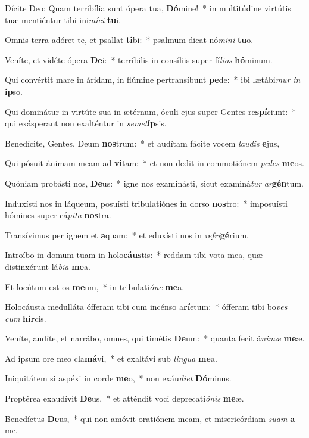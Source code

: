 \item Dícite Deo: Quam terribília sunt ópera tua, \textbf{Dó}mine!~* in multitúdine virtútis tuæ mentiéntur tibi ini\textit{mí}\textit{ci} \textbf{tu}i.
\item Omnis terra adóret te, et psallat \textbf{ti}bi:~* psalmum dicat nó\textit{mi}\textit{ni} \textbf{tu}o.
\item Veníte, et vidéte ópera \textbf{De}i:~* terríbilis in consíliis super fí\textit{li}\textit{os} \textbf{hó}minum.
\item Qui convértit mare in áridam, in flúmine pertransíbunt \textbf{pe}de:~* ibi lætábi\textit{mur} \textit{in} \textbf{ip}so.
\item Qui dominátur in virtúte sua in ætérnum, óculi ejus super Gentes re\textbf{spí}ciunt:~* qui exásperant non exalténtur in \textit{se}\textit{met}\textbf{íp}sis.
\item Benedícite, Gentes, Deum \textbf{nos}trum:~* et audítam fácite vocem \textit{lau}\textit{dis} \textbf{e}jus,
\item Qui pósuit ánimam meam ad \textbf{vi}tam:~* et non dedit in commotiónem \textit{pe}\textit{des} \textbf{me}os.
\item Quóniam probásti nos, \textbf{De}us:~* igne nos examinásti, sicut examiná\textit{tur} \textit{ar}\textbf{gén}tum.
\item Induxísti nos in láqueum, posuísti tribulatiónes in dorso \textbf{nos}tro:~* imposuísti hómines super cá\textit{pi}\textit{ta} \textbf{nos}tra.
\item Transívimus per ignem et \textbf{a}quam:~* et eduxísti nos in \textit{re}\textit{fri}\textbf{gé}rium.
\item Introíbo in domum tuam in holo\textbf{cáus}tis:~* reddam tibi vota mea, quæ distinxérunt lá\textit{bi}\textit{a} \textbf{me}a.
\item Et locútum est os \textbf{me}um,~* in tribulati\textit{ó}\textit{ne} \textbf{me}a.
\item Holocáusta medulláta ófferam tibi cum incénso a\textbf{rí}etum:~* ófferam tibi bo\textit{ves} \textit{cum} \textbf{hir}cis.
\item Veníte, audíte, et narrábo, omnes, qui timétis \textbf{De}um:~* quanta fecit á\textit{ni}\textit{mæ} \textbf{me}æ.
\item Ad ipsum ore meo cla\textbf{má}vi,~* et exaltávi sub \textit{lin}\textit{gua} \textbf{me}a.
\item Iniquitátem si aspéxi in corde \textbf{me}o,~* non exáu\textit{di}\textit{et} \textbf{Dó}minus.
\item Proptérea exaudívit \textbf{De}us,~* et atténdit voci deprecati\textit{ó}\textit{nis} \textbf{me}æ.
\item Benedíctus \textbf{De}us,~* qui non amóvit oratiónem meam, et misericórdiam \textit{su}\textit{am} \textbf{a} me.
